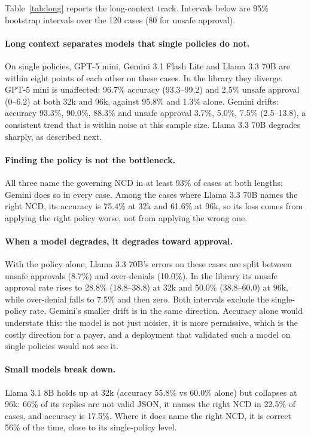 \documentclass[11pt]{article}
\begin{document}
Table~\ref{tab:long} reports the long-context track. Intervals below are 95\% bootstrap
intervals over the 120 cases (80 for unsafe approval).

\paragraph{Long context separates models that single policies do not.} On single policies, GPT-5
mini, Gemini 3.1 Flash Lite and Llama 3.3 70B are within eight points of each other on these
cases. In the library they diverge. GPT-5 mini is unaffected: 96.7\% accuracy (93.3--99.2) and
2.5\% unsafe approval (0--6.2) at both 32k and 96k, against 95.8\% and 1.3\% alone. Gemini drifts:
accuracy 93.3\%, 90.0\%, 88.3\% and unsafe approval 3.7\%, 5.0\%, 7.5\% (2.5--13.8), a consistent
trend that is within noise at this sample size. Llama 3.3 70B degrades sharply, as described next.

\paragraph{Finding the policy is not the bottleneck.} All three name the governing NCD in at least
93\% of cases at both lengths; Gemini does so in every case. Among the cases where Llama 3.3 70B
names the right NCD, its accuracy is 75.4\% at 32k and 61.6\% at 96k, so its loss comes from
applying the right policy worse, not from applying the wrong one.

\paragraph{When a model degrades, it degrades toward approval.} With the policy alone, Llama 3.3
70B's errors on these cases are split between unsafe approvals (8.7\%) and over-denials (10.0\%).
In the library its unsafe approval rate rises to 28.8\% (18.8--38.8) at 32k and 50.0\%
(38.8--60.0) at 96k, while over-denial falls to 7.5\% and then zero. Both intervals exclude the
single-policy rate. Gemini's smaller drift is in the same direction. Accuracy alone would
understate this: the model is not just noisier, it is more permissive, which is the costly
direction for a payer, and a deployment that validated such a model on single policies would not
see it.

\paragraph{Small models break down.} Llama 3.1 8B holds up at 32k (accuracy 55.8\% vs 60.0\% alone)
but collapses at 96k: 66\% of its replies are not valid JSON, it names the right NCD in 22.5\% of
cases, and accuracy is 17.5\%. Where it does name the right NCD, it is correct 56\% of the time,
close to its single-policy level.
\end{document}

